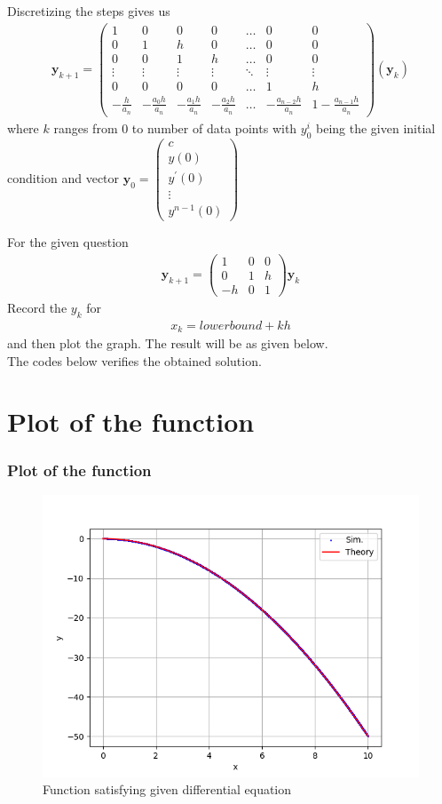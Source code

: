 \documentclass{beamer}
\providecommand{\brak}[1]{\ensuremath{\left(#1\right)}}
\theoremstyle{remark}
\newcommand{\myvec}[1]{\ensuremath{\begin{pmatrix}#1\end{pmatrix}}}
\let\vec\mathbf
\numberwithin{equation}{section}
\begin{document}
\begin{frame}
Discretizing the steps gives us
\begin{align}
	\vec{y}_{k+1} = \myvec{1 & 0 & 0 & 0 & \dots & 0 & 0\\ 0 & 1 & h & 0 & \dots & 0 & 0\\0 & 0 & 1 & h & \dots & 0 & 0\\\vdots & \vdots & \vdots & \vdots& \ddots & \vdots & \vdots\\
	0 & 0 & 0 & 0 & \dots & 1 & h\\-\frac{h}{a_n} & -\frac{a_0h}{a_n} & -\frac{a_1h}{a_n} & -\frac{a_2h}{a_n} & \dots & -\frac{a_{n-2}h}{a_n} & 1-\frac{a_{n-1}h}{a_n}}\brak{\vec{y}_{k}}
\end{align}
where $k$ ranges from 0 to number of data points with $y^{i}_0$ being the given initial condition and vector $\vec{y}_0 = \myvec{c\\y\brak{0}\\y^\prime\brak{0}\\\vdots\\y^{n-1}\brak{0}}$
\end{frame}
\begin{frame}
For the given question\\
\begin{align}
	\vec{y}_{k+1} = \myvec{1 & 0 & 0\\ 0 & 1 & h\\ -h & 0 & 1}\vec{y}_k
\end{align}
Record the $y_k$ for 
\begin{align}
x_k =lowerbound+kh
\end{align}
and then plot the graph. The result will be as given below.\\
The codes below verifies the obtained solution. 
\end{frame}
\section{Plot of the function}
\begin{frame}
\frametitle{Plot of the function}
\begin{figure}[H]
    \centering
	\includegraphics[width=0.8\columnwidth]{figs/fig.png}
    \caption{Function satisfying given differential equation}
    \end{figure}   
\end{frame}
\end{document}
